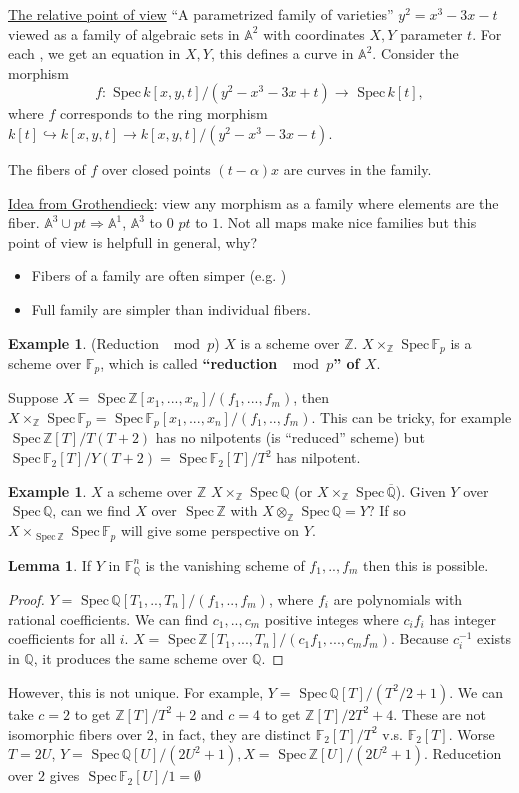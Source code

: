 \documentclass[11pt]{article}
\theoremstyle{definition}
\newtheorem{lemma}[thm]{Lemma}
\newtheorem{ex}[thm]{Example}
\newcommand{\spec}{\text{ Spec}\,}
\newcommand{\affn}{\mathbb A}
\newcommand{\intg}{\mathbb Z}
\newcommand{\bbf}{\mathbb F}
\newcommand{\ratl}{\mathbb Q}
\newcommand{\Lrta}{\Longrightarrow}
\newcommand{\lrta}{\longrightarrow}
\newcommand{\inj}{\hookrightarrow}
\begin{document}
\underline{The relative point of view}
``A parametrized family of varieties''
$y^2=x^3-3x-t$ viewed as a family of algebraic sets in $\affn^2$ with coordinates $X,Y$ parameter $t$. For each %
, we get an equation in $X,Y$, this defines a curve in $\affn^2$. Consider the morphism
$$
f:\spec k[x,y,t]/(y^2-x^3-3x+t)\lrta \spec k[t],
$$
where $f$ corresponds to the ring morphism $k[t]\inj k[x,y,t]\lrta k[x,y,t]/(y^2-x^3-3x-t)$.

The fibers of $f$ over closed points $(t-\alpha)x$ are curves in the family.

\underline{Idea from Grothendieck}: view any morphism as a family where elements are the fiber. $\affn^3\cup pt\Lrta \affn^1$, $\affn^3$ to $0$ $pt$ to $1$. Not all maps make  nice families but this point of view is helpfull in general, why?
\begin{itemize}
	\item Fibers of a  family are often simper (e.g. )
	\item Full family are simpler than individual fibers.
\end{itemize}

\begin{ex}
(Reduction $\mod p$) $X$ is a scheme over $\intg$. $X\times_\intg \spec \bbf_p$ is a scheme over $\bbf_p$, which is called \textbf{``reduction $\mod p$'' of $X$}.

Suppose $X=\spec \intg[x_1,...,x_n]/(f_1,...,f_m)$, then
$X\times_\intg\spec \bbf_p=\spec \bbf_p[x_1,...,x_n]/(f_1,..,f_m)$. This can be tricky, for example $\spec \intg[T]/T(T+2)$ has no nilpotents (is ``reduced'' scheme) but $\spec \bbf_2[T]/Y(T+2)=\spec \bbf_2[T]/T^2$ has nilpotent. 
\end{ex}
\begin{ex}
$X$ a scheme over $\intg$
$X\times_\intg \spec \ratl$ (or $X\times_\intg \spec \overline{\ratl}$). Given $Y$ over $\spec \ratl$, can we find $X$ over $\spec \intg$ with $X\otimes_\intg \spec \ratl=Y$? If so $X\times_{\spec \intg} \spec \bbf_p$ will give some perspective on $Y$.
\end{ex}
\begin{lemma}
If $Y$ in $\bbf^n_\ratl$ is the vanishing scheme of $f_1,..,f_m$ then this is possible.
\end{lemma}
\begin{proof}
$Y=\spec \ratl[T_1,..,T_n]/(f_1,..,f_m)$, where $f_i$ are polynomials with rational coefficients. We can find $c_1,..,c_m$ positive integes where $c_if_i$ has integer coefficients for all $i$. $X=\spec \intg[T_1,...,T_n]/(c_1f_1,...,c_mf_m)$. Because $c_i^{-1}$ exists in $\ratl$, it produces the same scheme over $\ratl$. 

\end{proof}
However, this is not unique. For example, $Y=\spec \ratl[T]/(T^2/2+1)$. We can take $c=2$ to get $\intg[T]/T^2+2$ and $c=4$ to get $\intg[T]/2T^2+4$. These are not isomorphic fibers over $2$, in fact, they are distinct
$\bbf_2[T]/T^2$ v.s. $\bbf_2[T]$. Worse $T=2U$, $Y=\spec \ratl[U]/(2U^2+1), X=\spec \intg[U]/(2U^2+1)$. Reducetion over $2$ gives $\spec \bbf_2[U]/1=\emptyset$ 
\end{document}
